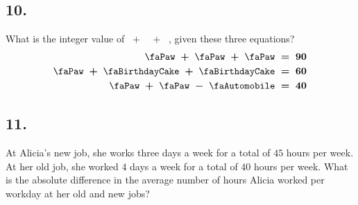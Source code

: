 \documentclass[12pt]{article}
\begin{document}
\subsection*{10.}
What is the integer value of \faPaw ~$\bm{+}$~ \faBirthdayCake ~$\bm{+}$~ \faAutomobile, given these three equations?
\begin{align*}
\text{\faPaw} ~\bm{+}~ \text{\faPaw} ~\bm{+}~ \text{\faPaw} & \bm{~=~ 90} \\
\text{\faPaw} ~\bm{+}~ \text{\faBirthdayCake} ~\bm{+}~ \text{\faBirthdayCake} & \bm{~=~ 60} \\
\text{\faPaw} ~\bm{+}~ \text{\faPaw} ~\bm{-}~ \text{\faAutomobile} & \bm{~=~ 40}
\end{align*}

\nopagebreak

\fbox{\phantom{ANSWER}}

\begin{answer}
%
\end{answer}


\subsection*{11.}
At Alicia's new job, she works three days a week for a total of $45$ hours per week. At her old job, she worked $4$ days a week for a total of $40$ hours per week. What is the absolute difference in the average number of hours Alicia worked per workday at her old and new jobs?
\end{document}
